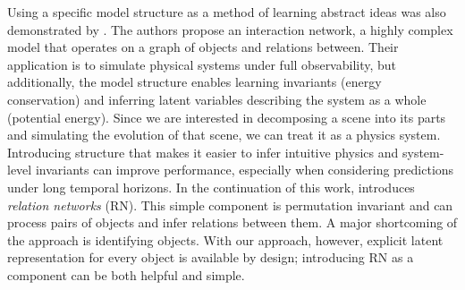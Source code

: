         
%
%
%   
        Using a specific model structure as a method of learning abstract ideas was also demonstrated by \cite{Battaglia2016}. The authors propose an interaction network, a highly complex model that operates on a graph of objects and relations between. Their application is to simulate physical systems under full observability, but additionally, the model structure enables learning invariants (\!\eg energy conservation) and inferring latent variables describing the system as a whole (\!\eg potential energy).
        Since we are interested in decomposing a scene into its parts and simulating the evolution of that scene, we can treat it as a physics system. Introducing structure that makes it easier to infer intuitive physics and system-level invariants can improve performance, especially when considering predictions under long temporal horizons.
        In the continuation of this work, \cite{Santoro2017} introduces \emph{relation networks} (RN). This simple component is permutation invariant and can process pairs of objects and infer relations between them. A major shortcoming of the approach is identifying objects. With our approach, however, explicit latent representation for every object is available by design; introducing RN as a component can be both helpful and simple.